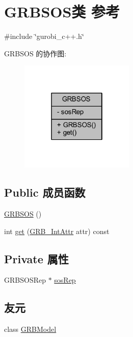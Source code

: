 \hypertarget{classGRBSOS}{}\section{G\+R\+B\+S\+O\+S类 参考}
\label{classGRBSOS}


{\ttfamily \#include \char`\"{}gurobi\+\_\+c++.\+h\char`\"{}}



G\+R\+B\+S\+OS 的协作图\+:
\nopagebreak
\begin{figure}[H]
\begin{center}
\leavevmode
\includegraphics[width=154pt]{classGRBSOS__coll__graph}
\end{center}
\end{figure}
\subsection*{Public 成员函数}
\begin{DoxyCompactItemize}
\item 
\hyperlink{classGRBSOS_af0654658e9270d0dc40bd91fb64dc94a}{G\+R\+B\+S\+OS} ()
\item 
int \hyperlink{classGRBSOS_a5f1fa1ce71fa5552f1d65171726b4729}{get} (\hyperlink{gurobi__c_09_09_8h_acfc136f6822be3d3e36ac84bd76b0900}{G\+R\+B\+\_\+\+Int\+Attr} attr) const 
\end{DoxyCompactItemize}
\subsection*{Private 属性}
\begin{DoxyCompactItemize}
\item 
G\+R\+B\+S\+O\+S\+Rep $\ast$ \hyperlink{classGRBSOS_a322ecee38e16d78a226ed3cdb3227b5b}{sos\+Rep}
\end{DoxyCompactItemize}
\subsection*{友元}
\begin{DoxyCompactItemize}
\item 
class \hyperlink{classGRBSOS_a43690ac42cca6dade14d7fde97306d59}{G\+R\+B\+Model}
\end{DoxyCompactItemize}


